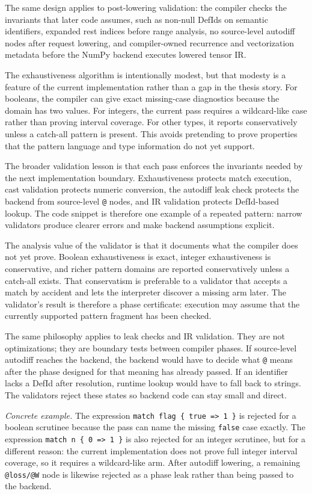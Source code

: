 The same design applies to post-lowering validation: the compiler checks the
invariants that later code assumes, such as non-null DefIds on semantic
identifiers, expanded rest indices before range analysis, no source-level
autodiff nodes after request lowering, and compiler-owned recurrence and
vectorization metadata before the NumPy backend executes lowered tensor IR.

The exhaustiveness algorithm is intentionally modest, but that modesty is a
feature of the current implementation rather than a gap in the thesis story.
For booleans, the compiler can give exact missing-case diagnostics because the
domain has two values. For integers, the current pass requires a wildcard-like
case rather than proving interval coverage. For other types, it reports
conservatively unless a catch-all pattern is present. This avoids pretending to
prove properties that the pattern language and type information do not yet
support.

The broader validation lesson is that each pass enforces the invariants needed
by the next implementation boundary. Exhaustiveness protects match execution,
cast validation protects numeric conversion, the autodiff leak check protects
the backend from source-level \texttt{@} nodes, and IR validation protects
DefId-based lookup. The code snippet is therefore one example of a repeated
pattern: narrow validators produce clearer errors and make backend assumptions
explicit.

The analysis value of the validator is that it documents what the compiler does
not yet prove. Boolean exhaustiveness is exact, integer exhaustiveness is
conservative, and richer pattern domains are reported conservatively unless a
catch-all exists. That conservatism is preferable to a validator that accepts a
match by accident and lets the interpreter discover a missing arm later. The
validator's result is therefore a phase certificate: execution may assume that
the currently supported pattern fragment has been checked.

The same philosophy applies to leak checks and IR validation. They are not
optimizations; they are boundary tests between compiler phases. If source-level
autodiff reaches the backend, the backend would have to decide what \texttt{@}
means after the phase designed for that meaning has already passed. If an
identifier lacks a DefId after resolution, runtime lookup would have to fall
back to strings. The validators reject these states so backend code can stay
small and direct.

\textit{Concrete example.} The expression \texttt{match flag \{ true => 1 \}}
is rejected for a boolean scrutinee because the pass can name the missing
\texttt{false} case exactly. The expression \texttt{match n \{ 0 => 1 \}} is
also rejected for an integer scrutinee, but for a different reason: the current
implementation does not prove full integer interval coverage, so it requires a
wildcard-like arm. After autodiff lowering, a remaining \texttt{@loss/@W} node
is likewise rejected as a phase leak rather than being passed to the backend.
